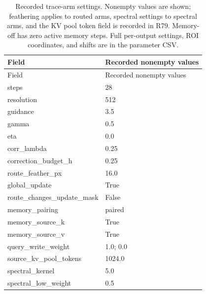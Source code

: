 \begingroup\scriptsize\setlength{\tabcolsep}{2pt}
\begin{longtable}{p{.46\linewidth}p{.46\linewidth}}
\caption{Recorded trace-arm settings. Nonempty values are shown; feathering applies to routed arms, spectral settings to spectral arms, and the KV pool token field is recorded in R79. Memory-off has zero active memory steps. Full per-output settings, ROI coordinates, and shifts are in the parameter CSV.}\\
\hline
Field & Recorded nonempty values \\ \hline
\endfirsthead
\hline
Field & Recorded nonempty values \\ \hline
\endhead
steps & 28 \\
resolution & 512 \\
guidance & 3.5 \\
gamma & 0.5 \\
eta & 0.0 \\
corr\_lambda & 0.25 \\
correction\_budget\_h & 0.25 \\
route\_feather\_px & 16.0 \\
global\_update & True \\
route\_changes\_update\_mask & False \\
memory\_pairing & paired \\
memory\_source\_k & True \\
memory\_source\_v & True \\
query\_write\_weight & 1.0; 0.0 \\
source\_kv\_pool\_tokens & 1024.0 \\
spectral\_kernel & 5.0 \\
spectral\_low\_weight & 0.5 \\
\hline\end{longtable}
\endgroup

